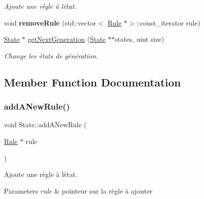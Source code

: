 \begin{DoxyCompactItemize}
\begin{DoxyCompactList}\small\item\em Ajoute une règle à l\textquotesingle{}état. \end{DoxyCompactList}\item 
\mbox{\label{class_state_accc2568a8052d334b9ff57208b749042}} 
void {\bfseries remove\+Rule} (std\+::vector$<$ \mbox{\hyperlink{class_rule}{Rule}} $\ast$$>$\+::const\+\_\+iterator rule)
\item 
\mbox{\hyperlink{class_state}{State}} $\ast$ \mbox{\hyperlink{class_state_a0c83be85a68011616dad6e9df0bee725}{get\+Next\+Generation}} (\mbox{\hyperlink{class_state}{State}} $\ast$$\ast$states, uint size)
\begin{DoxyCompactList}\small\item\em Change les états de génération. \end{DoxyCompactList}\end{DoxyCompactItemize}


\subsection{Member Function Documentation}
\mbox{\label{class_state_ae180b397cb705b41ec417c34a46473dc}} 
\subsubsection{\texorpdfstring{add\+A\+New\+Rule()}{addANewRule()}}
{\footnotesize\ttfamily void State\+::add\+A\+New\+Rule (\begin{DoxyParamCaption}\item[{\mbox{\hyperlink{class_rule}{Rule}} $\ast$}]{rule }\end{DoxyParamCaption})}



Ajoute une règle à l\textquotesingle{}état. 


\begin{DoxyParams}{Parameters}
{\em rule} & pointeur sur la règle à ajouter \\
\hline
\end{DoxyParams}
\mbox{\label{class_state_a0c83be85a68011616dad6e9df0bee725}} 
